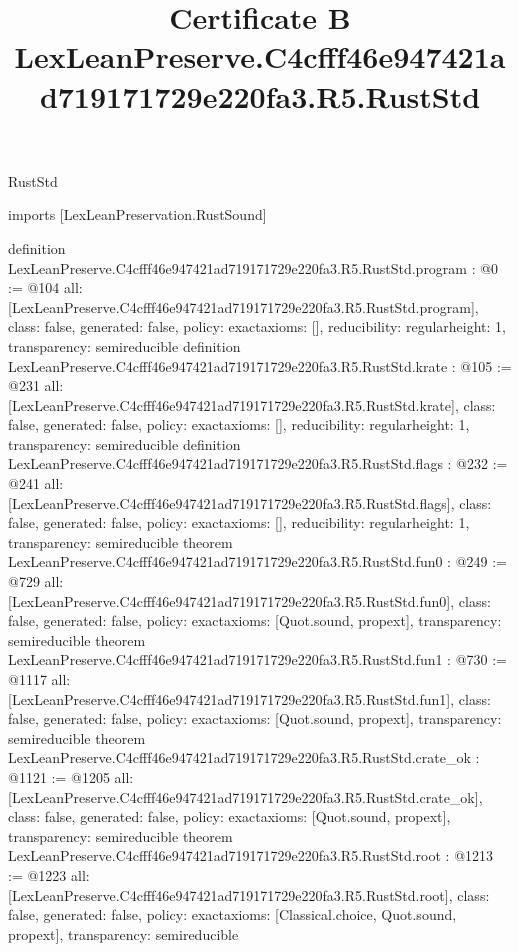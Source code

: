 \begin{lexlean}{RustStd}
\title{Certificate B LexLeanPreserve.C4cfff46e947421ad719171729e220fa3.R5.RustStd}
\begin{coremodule}
imports [LexLeanPreservation.RustSound]

definition LexLeanPreserve.C4cfff46e947421ad719171729e220fa3.R5.RustStd.program : @0 := @104 {
  all: [LexLeanPreserve.C4cfff46e947421ad719171729e220fa3.R5.RustStd.program],
  class: false,
  generated: false,
  policy: exact{axioms: []},
  reducibility: regular{height: 1},
  transparency: semireducible
}
definition LexLeanPreserve.C4cfff46e947421ad719171729e220fa3.R5.RustStd.krate : @105 := @231 {
  all: [LexLeanPreserve.C4cfff46e947421ad719171729e220fa3.R5.RustStd.krate],
  class: false,
  generated: false,
  policy: exact{axioms: []},
  reducibility: regular{height: 1},
  transparency: semireducible
}
definition LexLeanPreserve.C4cfff46e947421ad719171729e220fa3.R5.RustStd.flags : @232 := @241 {
  all: [LexLeanPreserve.C4cfff46e947421ad719171729e220fa3.R5.RustStd.flags],
  class: false,
  generated: false,
  policy: exact{axioms: []},
  reducibility: regular{height: 1},
  transparency: semireducible
}
theorem LexLeanPreserve.C4cfff46e947421ad719171729e220fa3.R5.RustStd.fun0 : @249 := @729 {
  all: [LexLeanPreserve.C4cfff46e947421ad719171729e220fa3.R5.RustStd.fun0],
  class: false,
  generated: false,
  policy: exact{axioms: [Quot.sound, propext]},
  transparency: semireducible
}
theorem LexLeanPreserve.C4cfff46e947421ad719171729e220fa3.R5.RustStd.fun1 : @730 := @1117 {
  all: [LexLeanPreserve.C4cfff46e947421ad719171729e220fa3.R5.RustStd.fun1],
  class: false,
  generated: false,
  policy: exact{axioms: [Quot.sound, propext]},
  transparency: semireducible
}
theorem LexLeanPreserve.C4cfff46e947421ad719171729e220fa3.R5.RustStd.crate_ok : @1121 := @1205 {
  all: [LexLeanPreserve.C4cfff46e947421ad719171729e220fa3.R5.RustStd.crate_ok],
  class: false,
  generated: false,
  policy: exact{axioms: [Quot.sound, propext]},
  transparency: semireducible
}
theorem LexLeanPreserve.C4cfff46e947421ad719171729e220fa3.R5.RustStd.root : @1213 := @1223 {
  all: [LexLeanPreserve.C4cfff46e947421ad719171729e220fa3.R5.RustStd.root],
  class: false,
  generated: false,
  policy: exact{axioms: [Classical.choice, Quot.sound, propext]},
  transparency: semireducible
}


\end{coremodule}
\end{lexlean}
